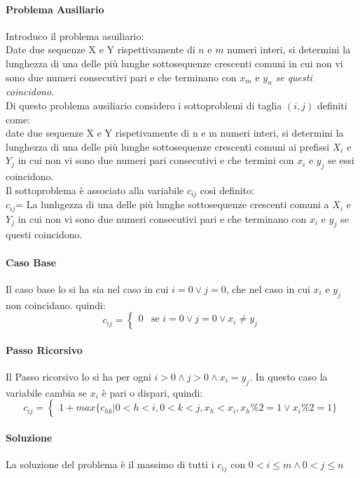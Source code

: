 \documentclass[12pt, a4paper, openany]{book}
\begin{document}
	\paragraph*{Problema Ausiliario}
	Introduco il problema asuiliario:
	\\Date due sequenze X e Y  rispettivamente di $n$ e $m$ numeri interi, si determini la lunghezza di una delle più lunghe sottosequenze crescenti comuni in cui non vi sono due numeri consecutivi pari
	e che terminano con $x_m$ e $y_n$ \emph{se questi coincidono}.
	\\Di questo problema ausiliario considero i sottoproblemi di taglia $(i,j)$ definiti come:
	\\date due sequenze X e Y rispetivamente di n e m numeri interi, si determini la lunghezza di una delle più lunghe sottosequenze crescenti comuni
	ai prefissi $X_i$ e $Y_j$ in cui non vi sono due numeri pari consecutivi e che termini con $x_i$ e $y_j$ se essi coincidono.
	\\Il sottoproblema è associato alla variabile $c_{ij}$ così definito:
	\\$c_{ij}$= La lunhgezza di una delle più lunghe sottosequenze crescenti comuni a $X_i$ e $Y_j$ in cui non vi sono due numeri consecutivi pari e che terminano con $x_i$ e $y_j$ se questi coincidono.

\paragraph*{Caso Base}
Il caso base lo si ha sia nel caso in cui $i = 0 \vee j=0$, che nel caso in cui $x_i$ e $y_j$ non coincidano. quindi:
$$c_{ij} = \begin{cases}
		0 & \text{se } i=0 \vee j=0 \vee x_i\neq y_j
	\end{cases}
$$
\paragraph*{Passo Ricorsivo}
Il Passo ricorsivo lo si ha per ogni $i>0 \wedge j>0 \wedge x_i=y_j$.
In questo caso la variabile cambia se $x_i$ è pari o dispari, quindi:
$$c_{ij}= \begin{cases}
		1 + max\{c_{hk}|0<h<i,0<k<j, x_h<x_i, x_h\%2 = 1 \vee x_i\%2=1\}
	\end{cases}
$$

\paragraph*{Soluzione}
La soluzione del problema è il massimo di tutti i $c_{ij}$ con $0<i\leq m \wedge 0<j \leq n$
\end{document}
